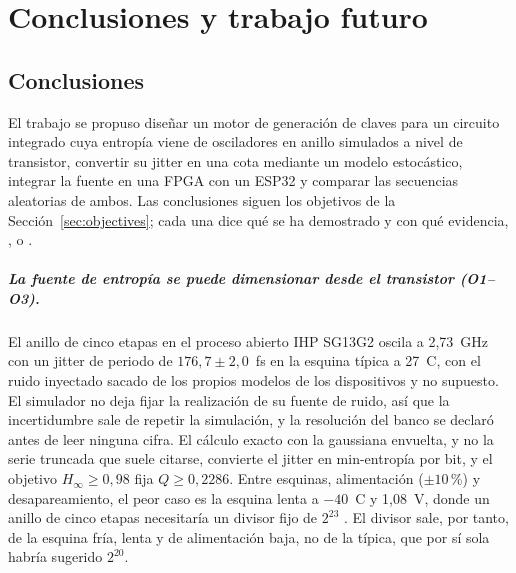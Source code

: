 \chapter{Conclusiones y trabajo futuro}
\label{ch:ch8_concl}

\section{Conclusiones}

El trabajo se propuso diseñar un motor de generación de claves para un
circuito integrado cuya entropía viene de osciladores en anillo simulados
a nivel de transistor, convertir su jitter en una cota mediante un modelo
estocástico, integrar la fuente en una \ac{FPGA} con un ESP32 y comparar
las secuencias aleatorias de ambos. Las conclusiones siguen los objetivos
de la Sección~\ref{sec:objectives}; cada una dice qué se ha demostrado y
con qué evidencia, \meas{}, \simu{} o \est{}.

\paragraph{La fuente de entropía se puede dimensionar desde el transistor
(O1--O3).} El anillo de cinco etapas en el proceso abierto IHP SG13G2
oscila a 2,73~GHz con un jitter de periodo de $176{,}7 \pm 2{,}0$~fs
\simu{} en la esquina típica a 27~\textdegree C, con el ruido inyectado
sacado de los propios modelos de los dispositivos y no supuesto. El simulador no deja
fijar la realización de su fuente de ruido, así que la incertidumbre sale
de repetir la simulación, y la resolución del banco se declaró antes de
leer ninguna cifra. El cálculo exacto con la gaussiana envuelta, y no la
serie truncada que suele citarse, convierte el jitter en min-entropía por
bit, y el objetivo $H_\infty \ge 0{,}98$ fija $Q \ge 0{,}2286$. Entre
esquinas, alimentación ($\pm 10$\,\%) y desapareamiento, el peor caso es
la esquina lenta a $-40$~\textdegree C y 1,08~V, donde un anillo de
cinco etapas necesitaría un divisor fijo de $2^{23}$ \simu{}. El divisor
sale, por tanto, de la esquina fría, lenta y de alimentación baja, no de
la típica, que por sí sola habría sugerido $2^{20}$.

